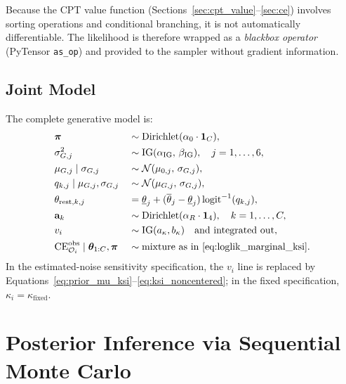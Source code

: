 \documentclass[12pt, a4paper]{article}
\newcommand{\Normal}{\mathcal{N}}
\newcommand{\IG}{\mathrm{IG}}
\newcommand{\Dir}{\mathrm{Dirichlet}}
\newcommand{\btheta}{\bm{\theta}}
\newcommand{\bpi}{\bm{\pi}}
\newcommand{\ba}{\mathbf{a}}
\newcommand{\ksi}{\kappa}
\begin{document}
Because the CPT value function (Sections~\ref{sec:cpt_value}--\ref{sec:ce})
involves sorting operations and conditional branching, it is not automatically
differentiable.  The likelihood is therefore wrapped as a \emph{blackbox
operator} (PyTensor \texttt{as\_op}) and provided to the sampler without
gradient information.

\subsection{Joint Model}

The complete generative model is:
\begin{alignat}{2}
  &\bpi                &&\sim \Dir(\alpha_0 \cdot \mathbf{1}_C),
  \nonumber\\
  &\sigma_{G,j}^2      &&\sim \IG(\alpha_{\mathrm{IG}},\, \beta_{\mathrm{IG}}),
  \quad j=1,\ldots,6,
  \nonumber\\
  &\mu_{G,j} \mid \sigma_{G,j}
                       &&\sim \Normal(\mu_{0,j},\, \sigma_{G,j}),
  \nonumber\\
  &q_{k,j} \mid \mu_{G,j}, \sigma_{G,j}
                       &&\sim \Normal(\mu_{G,j},\, \sigma_{G,j}),
  \nonumber\\
  &\theta_{\mathrm{rest},k,j}
                       &&= \underline{\theta}_j
                         + (\overline{\theta}_j-\underline{\theta}_j)
                           \operatorname{logit}^{-1}(q_{k,j}),
  \nonumber\\
  &\ba_k               &&\sim \Dir(\alpha_R \cdot \mathbf{1}_4),
  \quad k=1,\ldots,C,
  \nonumber\\
  &v_i                 &&\sim \IG(a_\ksi,b_\ksi)
  \quad\text{and integrated out},
  \nonumber\\
  &\mathrm{CE}^{\mathrm{obs}}_{\mathcal{O}_i} \mid \btheta_{1:C}, \bpi
                       &&\sim \text{mixture as in \eqref{eq:loglik_marginal_ksi}}.
  \label{eq:joint}
\end{alignat}
In the estimated-noise sensitivity specification, the $v_i$ line is replaced by
Equations~\eqref{eq:prior_mu_ksi}--\eqref{eq:ksi_noncentered}; in the fixed
specification, $\ksi_i=\ksi_{\mathrm{fixed}}$.

\section{Posterior Inference via Sequential Monte Carlo}
\label{sec:smc}
\end{document}
